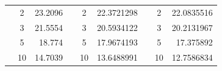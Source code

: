 \begin{table}[h]
\begin{tabular}{|ccrccrccr|}
\rowcolor[HTML]{DDFDFF} 
\multicolumn{1}{|c|}{\cellcolor[HTML]{FFFFC7}}                                & \multicolumn{1}{c|}{\cellcolor[HTML]{DDFDFF}2}         & \multicolumn{1}{r|}{\cellcolor[HTML]{DDFDFF}23.2096}    & \multicolumn{1}{c|}{\cellcolor[HTML]{FFFFC7}}                                & \multicolumn{1}{c|}{\cellcolor[HTML]{DDFDFF}2}         & \multicolumn{1}{r|}{\cellcolor[HTML]{DDFDFF}22.3721298} & \multicolumn{1}{c|}{\cellcolor[HTML]{FFFFC7}}                                & \multicolumn{1}{c|}{\cellcolor[HTML]{DDFDFF}2}         & 22.0835516                                              \\ \cline{2-3} \cline{5-6} \cline{8-9} 
\rowcolor[HTML]{DAE8FC} 
\multicolumn{1}{|c|}{\cellcolor[HTML]{FFFFC7}}                                & \multicolumn{1}{c|}{\cellcolor[HTML]{DAE8FC}3}         & \multicolumn{1}{r|}{\cellcolor[HTML]{DAE8FC}21.5554}    & \multicolumn{1}{c|}{\cellcolor[HTML]{FFFFC7}}                                & \multicolumn{1}{c|}{\cellcolor[HTML]{DAE8FC}3}         & \multicolumn{1}{r|}{\cellcolor[HTML]{DAE8FC}20.5934122} & \multicolumn{1}{c|}{\cellcolor[HTML]{FFFFC7}}                                & \multicolumn{1}{c|}{\cellcolor[HTML]{DAE8FC}3}         & 20.2131967                                              \\ \cline{2-3} \cline{5-6} \cline{8-9} 
\rowcolor[HTML]{DDFDFF} 
\multicolumn{1}{|c|}{\cellcolor[HTML]{FFFFC7}}                                & \multicolumn{1}{c|}{\cellcolor[HTML]{DDFDFF}5}         & \multicolumn{1}{r|}{\cellcolor[HTML]{DDFDFF}18.774}     & \multicolumn{1}{c|}{\cellcolor[HTML]{FFFFC7}}                                & \multicolumn{1}{c|}{\cellcolor[HTML]{DDFDFF}5}         & \multicolumn{1}{r|}{\cellcolor[HTML]{DDFDFF}17.9674193} & \multicolumn{1}{c|}{\cellcolor[HTML]{FFFFC7}}                                & \multicolumn{1}{c|}{\cellcolor[HTML]{DDFDFF}5}         & 17.375892                                               \\ \cline{2-3} \cline{5-6} \cline{8-9} 
\rowcolor[HTML]{DAE8FC} 
\multicolumn{1}{|c|}{\cellcolor[HTML]{FFFFC7}}                                & \multicolumn{1}{c|}{\cellcolor[HTML]{DAE8FC}10}        & \multicolumn{1}{r|}{\cellcolor[HTML]{DAE8FC}14.7039}    & \multicolumn{1}{c|}{\cellcolor[HTML]{FFFFC7}}                                & \multicolumn{1}{c|}{\cellcolor[HTML]{DAE8FC}10}        & \multicolumn{1}{r|}{\cellcolor[HTML]{DAE8FC}13.6488991} & \multicolumn{1}{c|}{\cellcolor[HTML]{FFFFC7}}                                & \multicolumn{1}{c|}{\cellcolor[HTML]{DAE8FC}10}        & 12.7586834                                              \\ \cline{2-3} \cline{5-6} \cline{8-9} 

\end{tabular}
\end{table}
